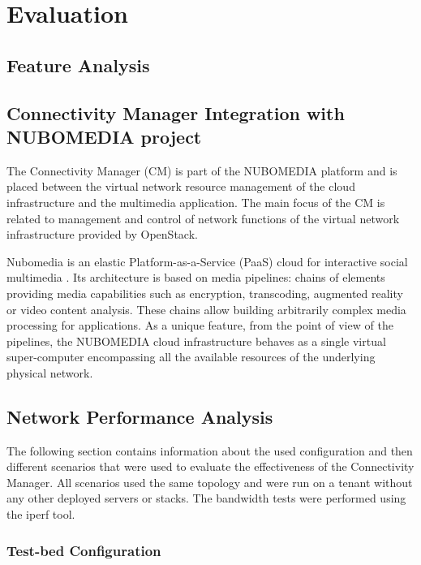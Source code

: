 \chapter{Evaluation}

\section{Feature Analysis}


\section{Connectivity Manager Integration with NUBOMEDIA project}


The Connectivity Manager (CM) is part of the NUBOMEDIA platform and is placed between the virtual network resource management of the cloud infrastructure and the
multimedia application. The main focus of the CM is related to management and control of network functions of the virtual network infrastructure provided by OpenStack.

Nubomedia is an elastic Platform-as-a-Service (PaaS) cloud for interactive social multimedia \cite{nubomedia}. Its architecture is based on media pipelines: chains of elements providing media capabilities such as encryption, transcoding, augmented reality or video content analysis. These chains allow building arbitrarily complex media processing for applications. As a unique feature, from the point of view of the pipelines, the NUBOMEDIA cloud infrastructure behaves as a single virtual super-computer encompassing all the available resources of the underlying physical network.

\section{Network Performance Analysis}

The following section contains information about the used configuration and then different scenarios that were used to evaluate the effectiveness of the Connectivity Manager. All scenarios used the same topology and were run on a tenant without any other deployed servers or stacks. The bandwidth tests were performed using the iperf tool.

\subsection{Test-bed Configuration}

